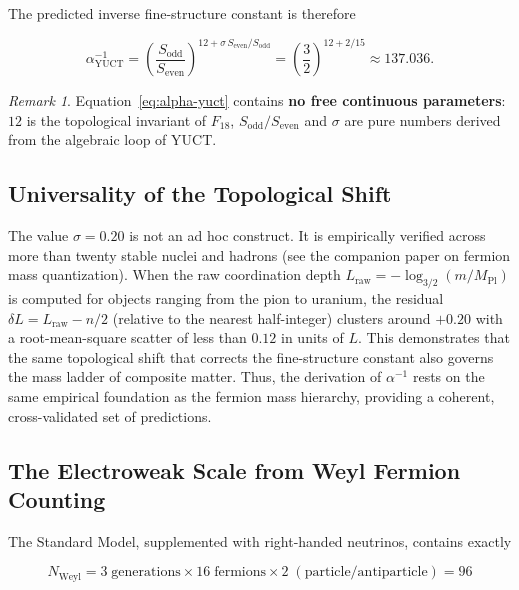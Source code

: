 \documentclass[12pt,a4paper]{article}
\theoremstyle{remark}
\newtheorem{remark}[theorem]{Remark}
\begin{document}
	The predicted inverse fine-structure constant is therefore
	
	\begin{equation}
		\boxed{\alpha^{-1}_{\mathrm{YUCT}} =
			\left(\frac{S_{\mathrm{odd}}}{S_{\mathrm{even}}}\right)^{12 + \sigma\,S_{\mathrm{even}}/S_{\mathrm{odd}}}
			= \left(\frac{3}{2}\right)^{12 + 2/15}
			\approx 137.036 } .
		\label{eq:alpha-yuct}
	\end{equation}
	
	\begin{remark}
		Equation~\eqref{eq:alpha-yuct} contains \textbf{no free continuous
			parameters}: \(12\) is the topological invariant of \(F_{18}\),
		\(S_{\mathrm{odd}}/S_{\mathrm{even}}\) and \(\sigma\) are pure numbers
		derived from the algebraic loop of YUCT.
	\end{remark}
	
	\subsection{Universality of the Topological Shift}
	
	The value \(\sigma = 0.20\) is not an ad hoc construct. It is empirically
	verified across more than twenty stable nuclei and hadrons (see the companion
	paper on fermion mass quantization). When the raw coordination depth
	\(L_{\mathrm{raw}} = -\log_{3/2}(m/M_{\mathrm{Pl}})\) is computed for objects
	ranging from the pion to uranium, the residual \(\delta L = L_{\mathrm{raw}} - n/2\)
	(relative to the nearest half-integer) clusters around \(+0.20\) with a
	root-mean-square scatter of less than \(0.12\) in units of \(L\). This
	demonstrates that the same topological shift that corrects the fine-structure
	constant also governs the mass ladder of composite matter. Thus, the
	derivation of \(\alpha^{-1}\) rests on the same empirical foundation as the
	fermion mass hierarchy, providing a coherent, cross-validated set of
	predictions.
	
	\subsection{The Electroweak Scale from Weyl Fermion Counting}
	
	The Standard Model, supplemented with right-handed neutrinos, contains exactly
	
	\begin{equation}
		N_{\mathrm{Weyl}} = 3\;\text{generations} \times 16\;\text{fermions}
		\times 2\;(\text{particle/antiparticle}) = 96
	\end{equation}
	
\end{document}

